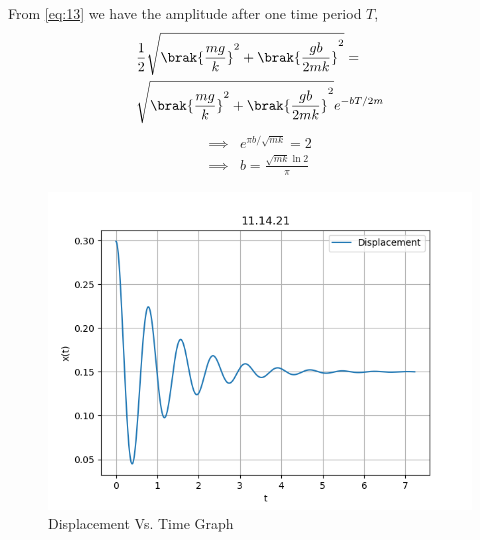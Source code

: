 \documentclass[journal,12pt,twocolumn]{IEEEtran}
\theoremstyle{remark}
\begin{document}
    From \eqref{eq:13} we have the amplitude after one time period $T$,
    \begin{align}
        \begin{split}
            &\frac{1}{2}\sqrt{\brak{\frac{mg}{k}}^2+\brak{\frac{gb}{2mk}}^2}= \\
            &\sqrt{\brak{\frac{mg}{k}}^2+\brak{\frac{gb}{2mk}}^2}e^{-bT/2m} \label{eq:14}
        \end{split}
    \end{align}
    \begin{align}
        \implies &e^{\pi b/\sqrt{mk}}=2 \label{eq:15}\\
        \implies &b=\frac{\sqrt{mk}\ln{2}}{\pi} \label{eq:16}
    \end{align}
    \begin{figure}[h]
        \centering
        \includegraphics[width=0.8\columnwidth]{ncert-physics/11/14/figs/11.14.21_plot.png}
        \caption{Displacement Vs. Time Graph}
        \label{fig:Fig-2}
    \end{figure}

\end{document}
